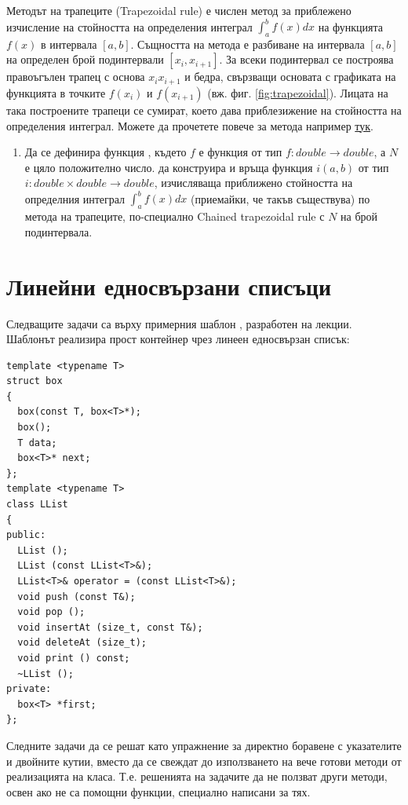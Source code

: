 \begin{mdframed}[hidealllines=true,backgroundcolor=gray!20]
  Методът на трапеците\cite{trapezoidal} (Trapezoidal rule) е числен метод за приблежено изчисление на стойността на определения интеграл $\int_{a}^{b} f(x) dx$ на функцията $f(x)$ в интервала $[a,b]$. Същността на метода е разбиване на интервала $[a,b]$ на определен брой подинтервали $[x_i,x_{i+1}]$. За всеки подинтервал се построява правоъгълен трапец с основа $x_i x_{i+1}$ и бедра, свързващи основата с графиката на функцията в точките $f(x_i)$ и $f(x_{i+1})$ (вж. фиг. \ref{fig:trapezoidal}). Лицата на така построените трапеци се сумират, което дава приблезижение на стойността на определения интеграл. Можете да прочетете повече за метода например \href{https://en.wikipedia.org/wiki/Trapezoidal_rule}{тук}\cite{trapezoidal}.
\end{mdframed}  

\begin{enumerate}[resume]

  \item Да се дефинира функция , където $f$ е функция от тип $f:double \rightarrow double$, а $N$ е цяло положително число.  да конструира и връща функция $i(a,b)$ от тип $i:double \times double \rightarrow double$, изчисляваща приближено стойността на определния интеграл $\int_{a}^{b} f(x) dx$ (приемайки, че такъв съществува) по метода на трапеците, по-специално Chained trapezoidal rule\cite{trapezoidal} с $N$ на брой подинтервала.
\end{enumerate}

\pagebreak

\clearpage\section{\label{sect:llists}Линейни едносвързани списъци}

\begin{mdframed}[hidealllines=true,backgroundcolor=gray!20]
Следващите задачи са върху примерния шаблон , разработен на лекции. Шаблонът реализира прост контейнер чрез линеен едносвързан списък:
\begin{verbatim}
template <typename T>
struct box
{
  box(const T, box<T>*);
  box();
  T data;
  box<T>* next;
};
template <typename T>
class LList
{
public:
  LList ();
  LList (const LList<T>&);
  LList<T>& operator = (const LList<T>&);
  void push (const T&);
  void pop ();
  void insertAt (size_t, const T&);
  void deleteAt (size_t);
  void print () const;
  ~LList ();
private:
  box<T> *first;
};

\end{verbatim}
Следните задачи да се решат като упражнение за директно боравене с указателите и двойните кутии, вместо да се свеждат до използването на вече готови методи от реализацията на класа. Т.е. решенията на задачите да не ползват други методи, освен ако не са помощни функции, специално написани за тях.
\end{mdframed}

